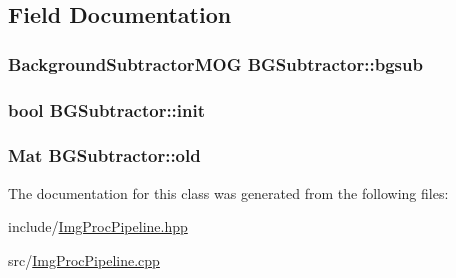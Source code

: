 \subsection{\-Field \-Documentation}
\hypertarget{classBGSubtractor_a9bf82e388f0d6b691ff4db17ac9e61f3}{
\subsubsection[{bgsub}]{\setlength{\rightskip}{0pt plus 5cm}\-Background\-Subtractor\-M\-O\-G {\bf \-B\-G\-Subtractor\-::bgsub}}}\label{classBGSubtractor_a9bf82e388f0d6b691ff4db17ac9e61f3}
\hypertarget{classBGSubtractor_a36f50b8934eb526d9c93e46169c28a2c}{
\subsubsection[{init}]{\setlength{\rightskip}{0pt plus 5cm}bool {\bf \-B\-G\-Subtractor\-::init}}}\label{classBGSubtractor_a36f50b8934eb526d9c93e46169c28a2c}
\hypertarget{classBGSubtractor_a667a712976bde1a2116f310d804f3c4e}{
\subsubsection[{old}]{\setlength{\rightskip}{0pt plus 5cm}\-Mat {\bf \-B\-G\-Subtractor\-::old}}}\label{classBGSubtractor_a667a712976bde1a2116f310d804f3c4e}


\-The documentation for this class was generated from the following files\-:\begin{DoxyCompactItemize}
\item 
include/\hyperlink{ImgProcPipeline_8hpp}{\-Img\-Proc\-Pipeline.\-hpp}\item 
src/\hyperlink{ImgProcPipeline_8cpp}{\-Img\-Proc\-Pipeline.\-cpp}\end{DoxyCompactItemize}
